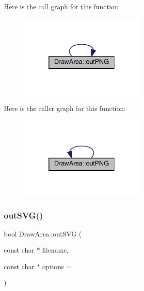 Here is the call graph for this function\+:
\nopagebreak
\begin{figure}[H]
\begin{center}
\leavevmode
\includegraphics[width=181pt]{class_draw_area_a9adee147b431fd0253e92085c5543a3e_cgraph}
\end{center}
\end{figure}
Here is the caller graph for this function\+:
\nopagebreak
\begin{figure}[H]
\begin{center}
\leavevmode
\includegraphics[width=181pt]{class_draw_area_a9adee147b431fd0253e92085c5543a3e_icgraph}
\end{center}
\end{figure}
\mbox{\label{class_draw_area_a1cb1704b9105de12e527e6fdf4a27070}} 
\subsubsection{\texorpdfstring{out\+S\+V\+G()}{outSVG()}\hspace{0.1cm}{\footnotesize\ttfamily [1/2]}}
{\footnotesize\ttfamily bool Draw\+Area\+::out\+S\+VG (\begin{DoxyParamCaption}\item[{const char $\ast$}]{filename,  }\item[{const char $\ast$}]{options = {} }\end{DoxyParamCaption})\hspace{0.3cm}{\ttfamily [inline]}}



